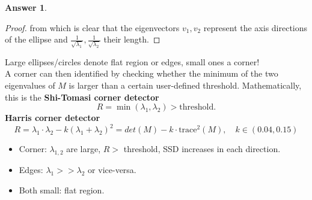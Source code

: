 \documentclass[a4paper,12 pt]{article}
\theoremstyle{definition}
\theoremstyle{remark}
\theoremstyle{definition}
\theoremstyle{definition}
\theoremstyle{definition}
\theoremstyle{definition}
\theoremstyle{remark}
\theoremstyle{remark}
\theoremstyle{definition}
\theoremstyle{definition}
\newtheorem*{answer}{Answer}
\begin{document}
\begin{enumerate}
\begin{enumerate}
\begin{answer}
\begin{proof}
from which is clear that the eigenvectors $v_1,v_2$ represent the axis directions of the ellipse and $\frac{1}{\sqrt{\lambda_1}},\frac{1}{\sqrt{\lambda_2}}$ their length.
\end{proof}
Large ellipses/circles denote flat region or edges, small ones a corner!\\
A corner can then identified by checking whether the minimum of the two eigenvalues of $M$ is larger than a certain user-defined threshold. Mathematically, this is the \textbf{Shi-Tomasi corner detector} 
\begin{equation}
R=\min (\lambda_1,\lambda_2) > \text{threshold}.
\end{equation}
\textbf{Harris corner detector}
\begin{equation}
R= \lambda_1 \cdot  \lambda_2 -k(\lambda_1+\lambda_2)^2= det(M)-k\cdot \text{trace}^2(M), \quad k\in (0.04,0.15)
\end{equation}
\begin{itemize}
\item Corner: $\lambda_{1,2}$ are large, $R>$ threshold, SSD increases in each direction.
\item Edges: $\lambda_1 >> \lambda_2$ or vice-versa.
\item Both small: flat region.
\end{itemize}


\end{answer}
\end{enumerate}
\end{enumerate}
\end{document}
